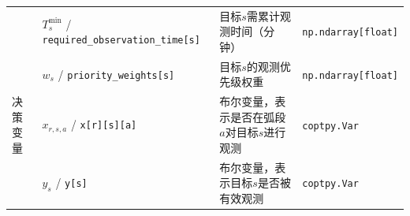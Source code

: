 \documentclass[openany,12pt,UTF8]{ctexart}
\begin{document}
\begin{table}
\begin{tabularx}{\columnwidth}{llXl}
             & $T_s^{\min}$ / \texttt{required\_observation\_time[s]} & 目标$s$需累计观测时间（分钟）                               & \texttt{np.ndarray[float]} \\
             & $w_s$ / \texttt{priority\_weights[s]}                  & 目标$s$的观测优先级权重                                  & \texttt{np.ndarray[float]} \\
        决策变量 & $x_{r,s,a}$ / \texttt{x[r][s][a]}                      & 布尔变量，表示是否在弧段$a$对目标$s$进行观测                      & \texttt{coptpy.Var}        \\
             & $y_s$ / \texttt{y[s]}                                  & 布尔变量，表示目标$s$是否被有效观测                            & \texttt{coptpy.Var}        \\
        \bottomrule
    \end{tabularx}
\end{table}
\end{document}
